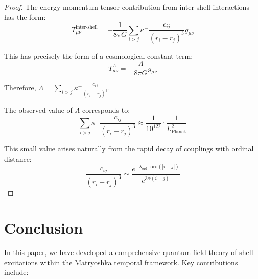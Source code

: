 \documentclass[12pt,a4paper]{article}
\begin{document}
\begin{proof}
The energy-momentum tensor contribution from inter-shell interactions has the form:
\begin{equation}
T_{\mu\nu}^{\text{inter-shell}} = -\frac{1}{8\pi G} \sum_{i>j} \kappa^- \frac{c_{ij}}{(r_i - r_j)^3} g_{\mu\nu}
\end{equation}

This has precisely the form of a cosmological constant term:
\begin{equation}
T_{\mu\nu}^{\Lambda} = -\frac{\Lambda}{8\pi G} g_{\mu\nu}
\end{equation}

Therefore, $\Lambda = \sum_{i>j} \kappa^- \frac{c_{ij}}{(r_i - r_j)^3}$.

The observed value of $\Lambda$ corresponds to:
\begin{equation}
\sum_{i>j} \kappa^- \frac{c_{ij}}{(r_i - r_j)^3} \approx \frac{1}{10^{122}} \cdot \frac{1}{L_{\text{Planck}}^2}
\end{equation}

This small value arises naturally from the rapid decay of couplings with ordinal distance:
\begin{equation}
\frac{c_{ij}}{(r_i - r_j)^3} \sim \frac{e^{-\lambda_{\text{ord}} \cdot \text{ord}(|i-j|)}}{e^{3\alpha (i-j)}}
\end{equation}
\end{proof}

\section{Conclusion}
\label{sec:conclusion}

In this paper, we have developed a comprehensive quantum field theory of shell excitations within the Matryoshka temporal framework. Key contributions include:
\end{document}
